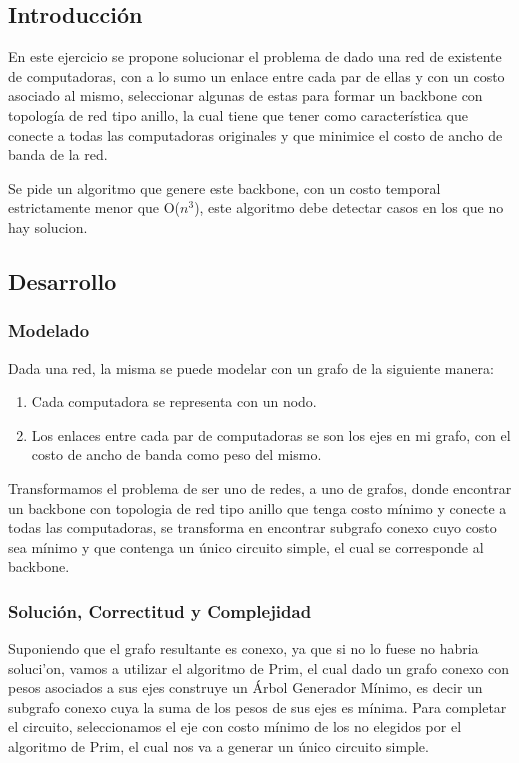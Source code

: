 \subsection{Introducci\'on} 

En este ejercicio se propone solucionar el problema de dado una red de existente de computadoras, con a lo sumo un enlace entre cada par de ellas y con un costo asociado al mismo, seleccionar algunas de estas para formar un backbone con topología de red tipo anillo, la cual tiene que tener como característica que conecte a todas las computadoras originales y que minimice el costo de ancho de banda de la red.

Se pide un algoritmo que genere este backbone, con un costo temporal estrictamente menor que O($n^3$), este algoritmo debe detectar casos en los que no hay solucion.

\subsection{Desarrollo}

\subsubsection{Modelado}

Dada una red, la misma se puede modelar con un grafo de la siguiente manera:

\begin{enumerate}
	\item Cada computadora se representa con un nodo.
	\item Los enlaces entre cada par de computadoras se son los ejes en mi grafo, con el costo de ancho de banda como peso del mismo.
\end{enumerate}

Transformamos el problema de ser uno de redes, a uno de grafos, donde encontrar un backbone con topologia de red tipo anillo que tenga costo mínimo y conecte a todas las computadoras, se transforma en encontrar subgrafo conexo cuyo costo sea mínimo y que contenga un único circuito simple, el cual se corresponde al backbone.

\subsubsection{Solución, Correctitud y Complejidad}

Suponiendo que el grafo resultante es conexo, ya que si no lo fuese no habria soluci'on, vamos a utilizar el algoritmo de Prim, el cual dado un grafo conexo con pesos asociados a sus ejes construye un Árbol Generador Mínimo, es decir un subgrafo conexo cuya la suma de los pesos de sus ejes es mínima. Para completar el circuito, seleccionamos el eje con costo mínimo de los no elegidos por el algoritmo de Prim, el cual nos va a generar un único circuito simple.

